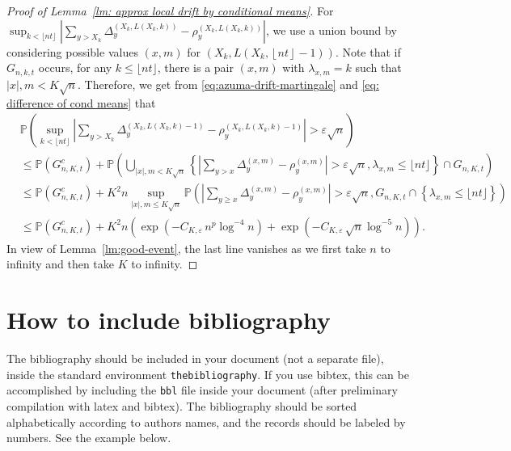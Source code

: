 \documentclass[EJP]{ejpecp} %
\newcommand{\abs}[1]{\left\vert #1 \right\vert}
\begin{document}
\begin{proof}[Proof of Lemma~\ref{lm: approx local drift by conditional means}]
For $\sup_{k <\lfloor nt \rfloor} \left| \sum_{y > X_k} \Delta_y^{\left(X_k,L(X_k, k)\right)} - \rho_y^{\left(X_k,L(X_k, k)\right)} \right|$, we use a union bound by considering possible values $(x,m)$ for $\left(X_k, L\left(X_k, \left\lfloor nt  \right\rfloor - 1\right)\right)$. Note that if $G_{n,k,t}$ occurs, for any $k\leq \lfloor nt \rfloor$, there is a pair $(x,m)$ with $\lambda_{x,m}=k$ such that $\abs{x},m <K\sqrt{n}$. Therefore, we get from \eqref{eq:azuma-drift-martingale} and \eqref{eq: difference of cond means} that 
\begin{align*}
	& \mathbb{P}\left( \sup_{k <\lfloor nt \rfloor} \left| \sum_{y > X_k} 
	\Delta_y^{\left(X_k,L(X_k, k)-1\right)} - \rho_y^{\left(X_k,L(X_k, k)-1\right)}
	\right| > \varepsilon \sqrt{n}  \right) \\
	&\le \mathbb{P}(G_{n, K, t}^c) + \mathbb{P}\left( \bigcup_{|x|, m < K \sqrt{n} } \left\{  \left| \sum_{y > x} \Delta_y^{(x,m)} - \rho_y^{(x,m)} \right|  > \varepsilon \sqrt{n},  \lambda_{x,m} \leq\lfloor nt \rfloor \right\} \cap G_{n,K,t} \right) \\
	&\le \mathbb{P}(G_{n, K, t}^c) + K^2 n \sup _{|x|, m \le  K \sqrt{n} }
	\mathbb{P}\left( \left| \sum_{y \ge x} \Delta_y^{(x,m)} - \rho_y^{(x,m)} \right|  > \varepsilon \sqrt{n} , G_{n,K,t}\cap \left\{\lambda_{x,m} \leq\lfloor nt \rfloor \right\}  \right) \\
	&\le \mathbb{P}(G_{n, K, t}^c) + K^2 n \left( \exp\left( - C_{K, \varepsilon} \, n^{p } \log^{-4} n \right) + \exp\left( - C_{K, \varepsilon} \, \sqrt{n}  \log^{-5} n \right)\right) 
	.\end{align*}
In view of Lemma~\ref{lm:good-event}, the last line vanishes as we first take $n$ to infinity and then take $K$ to infinity.
\end{proof}

\section{How to include bibliography}

The bibliography should be included in your document (not a separate file),
inside the standard environment \verb+thebibliography+. If you use bibtex,
this can be accomplished by including the \texttt{bbl} file inside your
document (after preliminary compilation with latex and bibtex). The
bibliography should be sorted alphabetically according to authors names, and
the records should be labeled by numbers. See the example below.
\end{document}

